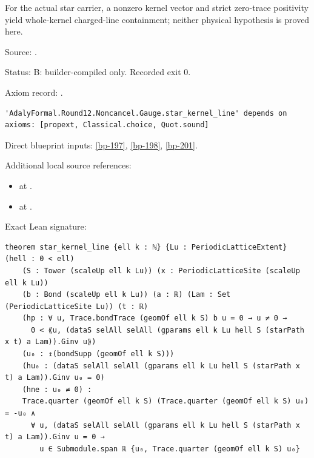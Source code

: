 \begin{theorem}[bp-202]
\label{bp-202}
\leanok
For the actual star carrier, a nonzero kernel vector and strict zero-trace positivity yield whole-kernel charged-line containment; neither physical hypothesis is proved here.

\par Source: \texttt{}.
\par Status: B: builder-compiled only. Recorded exit 0.
\par Axiom record: \texttt{}.
\begin{verbatim}
'AdalyFormal.Round12.Noncancel.Gauge.star_kernel_line' depends on axioms: [propext, Classical.choice, Quot.sound]
\end{verbatim}
\par Direct blueprint inputs: \ref{bp-197}, \ref{bp-198}, \ref{bp-201}.
\par Additional local source references:
\begin{itemize}
\item \texttt{} at \texttt{}.
\item \texttt{} at \texttt{}.
\end{itemize}
\par Exact Lean signature:
\begin{verbatim}
theorem star_kernel_line {ell k : ℕ} {Lu : PeriodicLatticeExtent} (hell : 0 < ell)
    (S : Tower (scaleUp ell k Lu)) (x : PeriodicLatticeSite (scaleUp ell k Lu))
    (b : Bond (scaleUp ell k Lu)) (a : ℝ) (Lam : Set (PeriodicLatticeSite Lu)) (t : ℝ)
    (hp : ∀ u, Trace.bondTrace (geomOf ell k S) b u = 0 → u ≠ 0 →
      0 < ⟪u, (dataS selAll selAll (gparams ell k Lu hell S (starPath x t) a Lam)).Ginv u⟫)
    (u₀ : ↥(bondSupp (geomOf ell k S)))
    (hu₀ : (dataS selAll selAll (gparams ell k Lu hell S (starPath x t) a Lam)).Ginv u₀ = 0)
    (hne : u₀ ≠ 0) :
    Trace.quarter (geomOf ell k S) (Trace.quarter (geomOf ell k S) u₀) = -u₀ ∧
      ∀ u, (dataS selAll selAll (gparams ell k Lu hell S (starPath x t) a Lam)).Ginv u = 0 →
        u ∈ Submodule.span ℝ {u₀, Trace.quarter (geomOf ell k S) u₀}
\end{verbatim}
\end{theorem}

